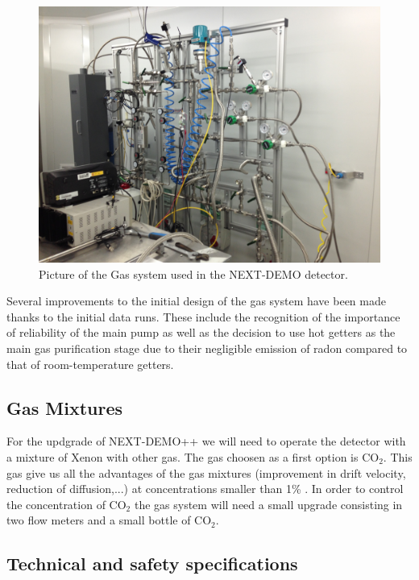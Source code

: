 \begin{figure}[tbh]
\centering
\includegraphics[width=\textwidth]{img/GasSystem2.jpg}
\caption{Picture of the Gas system used in the NEXT-DEMO detector.} \label{fig:GasSystem2}
\end{figure}


Several improvements to the initial design of the gas system have been made thanks to the initial data runs. These include the recognition of the importance of reliability of the main pump as well as the decision to use hot getters as the main gas purification stage due to their negligible emission of radon compared to that of room-temperature getters.





\subsection{Gas Mixtures}

For the updgrade of NEXT-DEMO++ we will need to operate the detector with a mixture of Xenon with other gas. The gas choosen as a first option is CO$_2$. This gas give us all the advantages of the gas mixtures (improvement in drift velocity, reduction of diffusion,...) at concentrations smaller than 1\% . In order to control the concentration of CO$_2$ the gas system will need a small upgrade consisting in two flow meters and a small bottle of CO$_2$.


\subsection{Technical and safety specifications}

